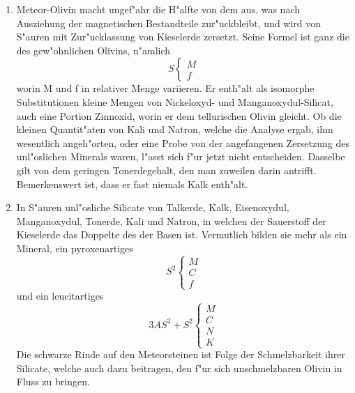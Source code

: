 \documentclass[a4paper, 11pt, oneside]{article}
\begin{document}
\begin{enumerate}
    \item Meteor-Olivin macht ungef"ahr die H"alfte von dem aus, was nach Ausziehung der magnetischen Bestandteile zur"uckbleibt, und wird von S"auren mit Zur"ucklassung von Kieselerde zersetzt. Seine Formel ist ganz die des gew"ohnlichen Olivins, n"amlich
    \begin{equation*}
        S
        \begin{cases}
          M\\      
          f
        \end{cases}
    \end{equation*}
    worin M und f in relativer Menge variieren. Er enth"alt als isomorphe Substitutionen kleine Mengen von Nickeloxyd- und Manganoxydul-Silicat, auch eine Portion Zinnoxid, worin er dem tellurischen Olivin gleicht. Ob die kleinen Quantit"aten von Kali und Natron, welche die Analyse ergab, ihm wesentlich angeh"orten, oder eine Probe von der angefangenen Zersetzung des unl"oslichen Minerals waren, l"asst sich f"ur jetzt nicht entscheiden. Dasselbe gilt von dem geringen Tonerdegehalt, den man zuweilen darin antrifft. Bemerkenswert ist, dass er fast niemals Kalk enth"alt.
    \item In S"auren unl"osliche Silicate von Talkerde, Kalk, Eisenoxydul, Manganoxydul, Tonerde, Kali und Natron, in welchen der Sauerstoff der Kieselerde das Doppelte des der Basen ist. Vermutlich bilden sie mehr als ein Mineral, ein pyroxenartiges
    \begin{equation*}
        S^2
        \begin{cases}
          M\\
          C\\
          f
        \end{cases}
    \end{equation*}
    und ein leucitartiges
    \begin{equation*}
        3AS^2 + S^2
        \begin{cases}
          M\\
          C\\
          N\\
          K
        \end{cases}
    \end{equation*}
    Die schwarze Rinde auf den Meteorsteinen ist Folge der Schmelzbarkeit ihrer Silicate, welche auch dazu beitragen, den f"ur sich unschmelzbaren Olivin in Fluss zu bringen.
        

\end{enumerate}
\end{document}
